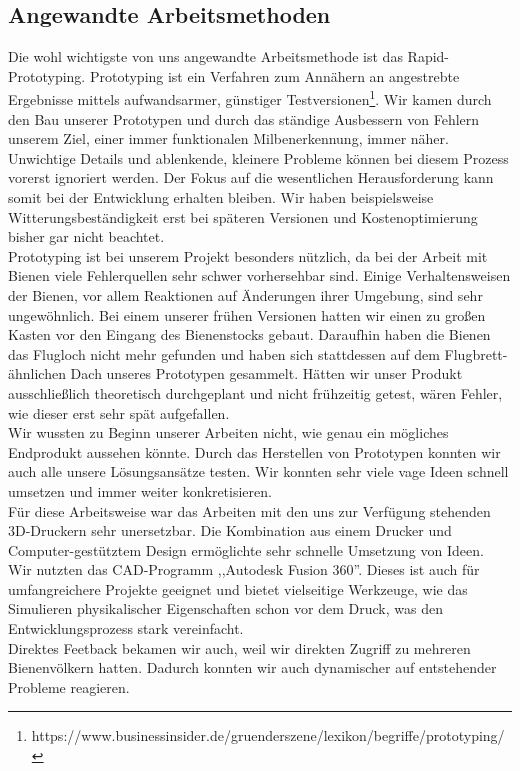 \documentclass[11pt,a4paper]{article}
\begin{document}
\subsection{Angewandte Arbeitsmethoden}
Die wohl wichtigste von uns angewandte Arbeitsmethode ist das Rapid-Prototyping. Prototyping ist ein Verfahren zum Annähern an angestrebte Ergebnisse mittels aufwandsarmer, günstiger Testversionen\footnote{https://www.businessinsider.de/gruenderszene/lexikon/begriffe/prototyping/}. Wir kamen durch den Bau unserer Prototypen und durch das ständige Ausbessern von Fehlern unserem Ziel, einer immer funktionalen Milbenerkennung, immer näher. Unwichtige Details und ablenkende, kleinere Probleme können bei diesem Prozess vorerst ignoriert werden. Der Fokus auf die wesentlichen Herausforderung kann somit bei der Entwicklung erhalten bleiben. Wir haben beispielsweise Witterungsbeständigkeit erst bei späteren Versionen und Kostenoptimierung bisher gar nicht beachtet.\\
Prototyping ist bei unserem Projekt besonders nützlich, da bei der Arbeit mit Bienen viele Fehlerquellen sehr schwer vorhersehbar sind. Einige Verhaltensweisen der Bienen, vor allem Reaktionen auf Änderungen ihrer Umgebung, sind sehr ungewöhnlich. Bei einem unserer frühen Versionen hatten wir einen zu großen Kasten vor den Eingang des Bienenstocks gebaut. Daraufhin haben die Bienen das Flugloch nicht mehr gefunden und haben sich stattdessen auf dem Flugbrett-ähnlichen Dach unseres Prototypen gesammelt. Hätten wir unser Produkt ausschließlich theoretisch durchgeplant und nicht frühzeitig getest, wären Fehler, wie dieser erst sehr spät aufgefallen.\\
Wir wussten zu Beginn unserer Arbeiten nicht, wie genau ein mögliches Endprodukt aussehen könnte. Durch das Herstellen von Prototypen konnten wir auch alle unsere Lösungsansätze testen. Wir konnten sehr viele vage Ideen schnell umsetzen und immer weiter konkretisieren.\\
Für diese Arbeitsweise war das Arbeiten mit den uns zur Verfügung stehenden 3D-Druckern sehr unersetzbar. Die Kombination aus einem Drucker und Computer-gestütztem Design ermöglichte sehr schnelle Umsetzung von Ideen. Wir nutzten das CAD-Programm ,,Autodesk Fusion 360''. Dieses ist auch für umfangreichere Projekte geeignet und bietet vielseitige Werkzeuge, wie das Simulieren physikalischer Eigenschaften schon vor dem Druck, was den Entwicklungsprozess stark vereinfacht. \\
Direktes Feetback bekamen wir auch, weil wir direkten Zugriff zu mehreren Bienenvölkern hatten. Dadurch konnten wir auch dynamischer auf entstehender Probleme reagieren. 
\end{document}
